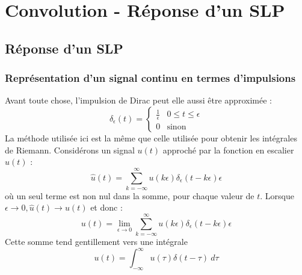 \chapter{Convolution - Réponse d'un SLP}
\section{Réponse d'un SLP}
	\subsection{Représentation d'un signal continu en termes d'impulsions}
	Avant toute chose, l'impulsion de Dirac peut elle aussi \^etre approximée :
	\begin{equation}
	\delta_\epsilon(t) = \left\{\begin{array}{ll}
	\frac{1}{\epsilon} & 0\leq t \leq \epsilon\\
	0 & \text{sinon}
	\end{array}\right.
	\end{equation}
	La méthode utilisée ici est la m\^eme que celle utilisée pour obtenir les 
	intégrales de Riemann. Considérons un signal $u(t)$ approché par la 
	fonction en escalier $\hat{u}(t)$ :
	\begin{equation}
	\hat{u}(t) = \sum_{k=-\infty}^\infty u(k\epsilon)\delta_\epsilon(t-k\epsilon)\epsilon
	\end{equation}
	où un seul terme est non nul dans la somme, pour chaque valeur de $t$. 
	Lorsque $\epsilon\rightarrow 0, \hat{u}(t) \rightarrow u(t)$ et donc :
	\begin{equation}
	u(t) = \lim\limits_{\epsilon\rightarrow 0} \sum_{k=-\infty}^\infty u(k
	\epsilon)\delta_\epsilon(t-k\epsilon)\epsilon
	\end{equation}
	Cette somme tend gentillement vers une intégrale 
	\begin{equation}
	u(t) = \int_{-\infty}^\infty u(\tau)\delta(t-\tau)\ d\tau
	\end{equation}


